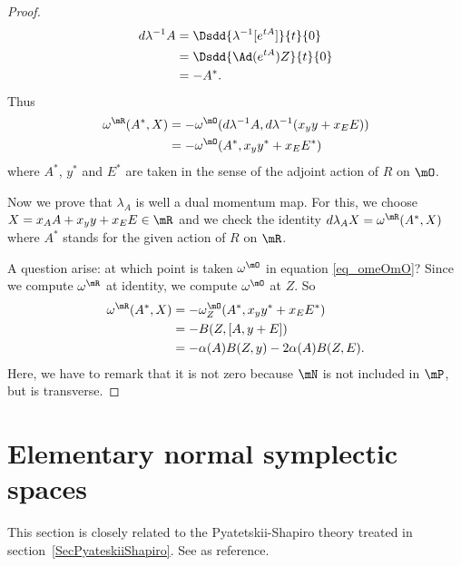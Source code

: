 \begin{proof}
\[\begin{split}
d\lambda^{-1}A&=\Dsdd{ \lambda^{-1}[ e^{tA}] }{t}{0}\\
		&=\Dsdd{ \Ad( e^{tA})Z }{t}{0}\\
		&=-A^*.
\end{split}
\]
Thus
\begin{equation} \label{eq_omeOmO}
\begin{split}
\omega^{\mR}(A^*,X)&=-\omega^{\mO}(d\lambda^{-1}A,d\lambda^{-1}(x_yy+x_EE))\\
		&=-\omega^{\mO}(A^*,x_yy^*+x_EE^*)
\end{split}
\end{equation}
where $A^*$, $y^*$ and $E^*$ are taken in the sense of the adjoint action of $R$ on $\mO$.

Now we prove that $\lambda_A$ is well a dual momentum map. For this, we choose $X=x_AA+x_yy+x_EE\in\mR$ and we check the identity $d\lambda_AX=\omega^{\mR}(A^*,X)$ where $A^*$ stands for the given action of $R$ on $\mR$.

A question arise: at which point is taken $\omega^{\mO}$ in equation \eqref{eq_omeOmO}? Since we compute $\omega^{\mR}$ at identity, we compute $\omega^{\mO}$ at $Z$. So
 \[
\begin{split}
  \omega^{\mR}(A^*,X)&=-\omega^{\mO}_Z(A^*,x_yy^*+x_EE^*)\\
		&=-B(Z,[A,y+E])\\
		&=-\alpha(A)B(Z,y)-2\alpha(A)B(Z,E).
\end{split}
\]
Here, we have to remark that it is not zero because $\mN$ is not included in $\mP$, but is transverse.

\end{proof}
\section{Elementary normal symplectic spaces}
\label{SecElemNormSymplSpace}

This section is closely related to the Pyatetskii-Shapiro theory treated in section~\ref{SecPyateskiiShapiro}. See \cite{QuantifKhalerian} as reference.

